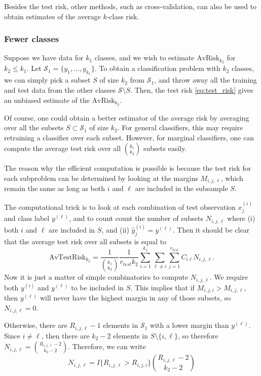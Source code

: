 \documentclass[12pt]{article}
\begin{document}
Besides the test risk, other methods, such as cross-validation, can
also be used to obtain estimates of the average $k$-class risk.

\subsubsection{Fewer classes}

Suppose we have data for $k_1$ classes, and we wish to estimate
$\text{AvRisk}_{k_2}$ for $k_2 \leq k_1$.  Let $\mathcal{S}_1
= \{y_1,\hdots,y_{k_1}\}$.  To obtain a classification problem with
$k_2$ classes, we can simply pick a subset $S$ of size $k_2$ from
$\mathcal{S}_1$, and throw away all the training and test data from the
other classes $\mathcal{S}\setminus S$.  Then, the test
risk \eqref{eq:test_risk} gives an unbiased estimate of the
$\text{AvRisk}_{k_2}$.

Of course, one could obtain a better estimator of the average risk by
averaging over all the subsets $S \subset \mathcal{S}_1$ of size
$k_2$.  For general classifiers, this may require retraining a
classifier over each subset.  However, for marginal classifiers, one
can compute the average test risk over all ${k_1}\choose{k_2}$ subsets
easily.

The reason why the efficient computation is possible is because the
test risk for each subproblem can be determined by looking at the
margins $M_{i, j, \ell}$, which remain the same as long as both $i$
and $\ell$ are included in the subsample $S$.

The computational trick is to look at each combination of test
observation $x_j^{(i)}$ and class label $y^{(\ell)}$, and to count
count the number of subsets $N_{i, j, \ell}$ where (i) both $i$ and
$\ell$ are included in $S$, and (ii) $\hat{y}_j^{(i)} = y^{(\ell)}$.
Then it should be clear that the average test risk over all subsets is
equal to
\begin{equation}\label{eq:avtestrisk}
\text{AvTestRisk}_{k_2} = \frac{1}{{{k_1}\choose{k_2}}}\frac{1}{r_{test}k_2} \sum_{i=1}^{k_1} \sum_{\ell\neq i} \sum_{j=1}^{r_{test}} C_{i\ell}N_{i, j, \ell}.
\end{equation}
Now it is just a matter of simple combinatorics to compute
$N_{i,j,\ell}$.  We require both $y^{(i)}$ and $y^{(\ell)}$ to be
included in $S$.  This implies that if $M_{i,j,i} > M_{i,j,\ell}$,
then $y^{(\ell)}$ will never have the highest margin in any of those
subsets, so $N_{i,j,\ell} = 0$.

Otherwise, there are $R_{i,j,\ell} - 1$ elements in $\mathcal{S}_1$
with a lower margin than $y^{(\ell)}$.  Since $i \neq \ell$, then there
are $k_2-2$ elements in $S \setminus \{i, \ell\}$, so therefore $N_{i,
j, \ell} = {{R_{i,j,\ell} - 2}\choose{k_2 - 2}}$.  Therefore, we can write
\begin{equation}\label{eq:avtestrisk_nil}
N_{i,j,\ell} = I\{R_{i,j,\ell} > R_{i,j,i}\}{{R_{i,j,\ell} -2}\choose{k_2 - 2}}
\end{equation}
\end{document}
